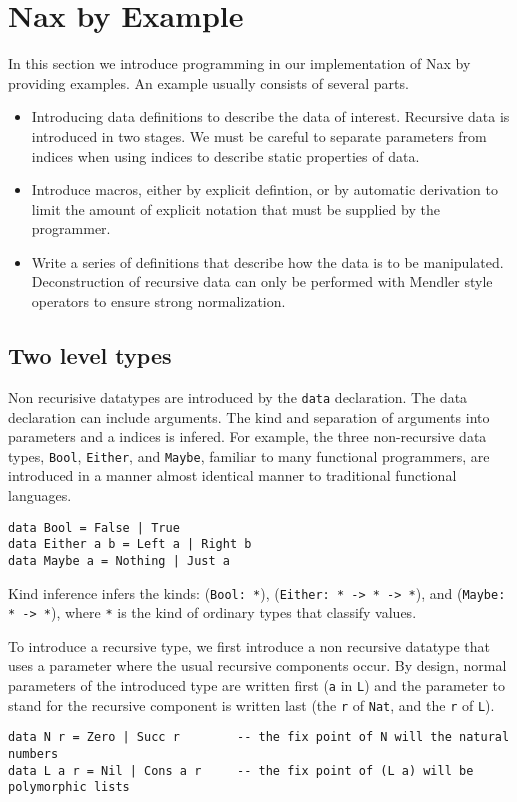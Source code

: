 
\section{Nax by Example}\label{sec:bg}

In this section we introduce programming in our implementation of Nax by providing
examples. An example usually consists of several parts.

\begin{itemize}
\item Introducing data definitions to describe the data of interest. Recursive
data is introduced in two stages. We must be careful to separate parameters
from indices when using indices to describe static properties of data.

\item Introduce macros, either by explicit defintion, or by automatic derivation
to limit the amount of explicit notation that must be supplied by the programmer.

\item Write a series of definitions that describe how the data is to be
manipulated. Deconstruction of recursive data can only be performed with Mendler style operators
to ensure strong normalization.

\end{itemize}

\subsection{Two level types}\label{2level}
Non recurisive datatypes are introduced by the \verb+data+ declaration.
The data declaration can include arguments. The kind and separation of
arguments into parameters and a indices is infered. For example, 
the three non-recursive data types, \verb+Bool+, \verb+Either+, and 
\verb+Maybe+, familiar to many functional programmers, are introduced
in a manner almost identical manner to traditional functional languages.

{\small
\begin{verbatim}   
data Bool = False | True
data Either a b = Left a | Right b
data Maybe a = Nothing | Just a
\end{verbatim}}
Kind inference infers the kinds:
(\verb+Bool: *+), (\verb+Either: * -> * -> *+), and 
(\verb+Maybe: * -> *+), where \verb+*+ is the kind of ordinary types that
classify values.

To introduce a recursive type, we first introduce a non recursive datatype
that uses a parameter where the usual recursive components occur. By design,
normal parameters of the introduced type are written first (\verb+a+ in \verb+L+)
and the parameter to stand for the recursive component is written last
(the \verb+r+ of \verb+Nat+, and the \verb+r+ of \verb+L+).
{\small
\begin{verbatim}
data N r = Zero | Succ r        -- the fix point of N will the natural numbers
data L a r = Nil | Cons a r     -- the fix point of (L a) will be polymorphic lists   
\end{verbatim}}

